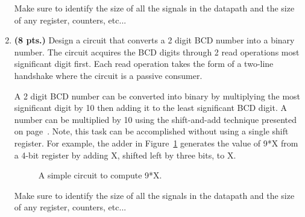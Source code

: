 \begin{enumerate}
Make sure to identify the size of all the signals in the datapath
and the size of any register, counters, etc...
 
\item {\bf (8 pts.)}
Design a circuit that converts a 2 digit BCD number into a
binary number.  The circuit acquires the BCD digits through 2 read
operations most significant digit first.  Each read operation takes 
the form of a two-line handshake where the circuit is a passive 
consumer.

A 2 digit BCD number can be converted into binary by multiplying the
most significant digit by 10 then adding it to the least significant
BCD digit.  A number can be multiplied by 10 using the shift-and-add
technique presented on page~\pageref{page:MulyBy10}.  Note, this
task can be accomplished without using a single shift register.
For example, the adder in Figure~\ref{fig:NineTimes} generates the value
of 9*X from a 4-bit register by adding X, shifted left by three bits, to X.

\begin{figure}[ht]
\caption{A simple circuit to compute 9*X.}
\label{fig:NineTimes}
\end{figure}

Make sure to identify the size of all the signals in the datapath
and the size of any register, counters, etc...
 

\end{enumerate}
